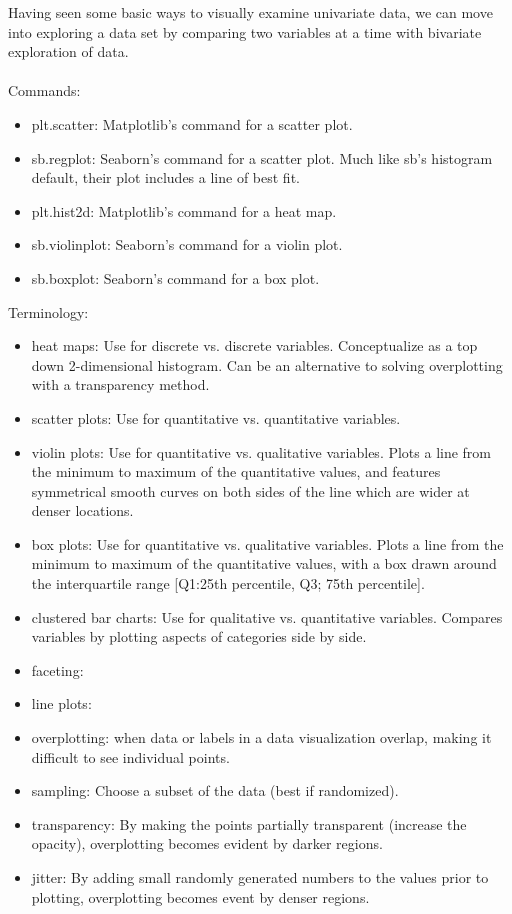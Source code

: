 Having seen some basic ways to visually examine univariate data, we can move into exploring a data set by comparing two variables at a time with bivariate exploration of data.
\\\\
Commands:
\begin{itemize}
	\item plt.scatter: Matplotlib's command for a scatter plot.
	\item sb.regplot: Seaborn's command for a scatter plot. Much like sb's histogram default, their plot includes a line of best fit.
	\item plt.hist2d: Matplotlib's command for a heat map.
	\item sb.violinplot: Seaborn's command for a violin plot.
	\item sb.boxplot: Seaborn's command for a box plot.
\end{itemize}

Terminology:
\begin{itemize}
	\item heat maps: Use for discrete vs. discrete variables. Conceptualize as a top down 2-dimensional histogram. Can be an alternative to solving overplotting with a transparency method.
	\item scatter plots: Use for quantitative vs. quantitative variables.
	\item violin plots: Use for quantitative vs. qualitative variables. Plots a line from the minimum to maximum of the quantitative values, and features symmetrical smooth curves on both sides of the line which are wider at denser locations.
	\item box plots: Use for quantitative vs. qualitative variables. Plots a line from the minimum to maximum of the quantitative values, with a box drawn around the interquartile range [Q1:25th percentile, Q3; 75th percentile].
	\item clustered bar charts: Use for qualitative vs. quantitative variables. Compares variables by plotting aspects of categories side by side.
	\item faceting:
	\item line plots:
	\item overplotting: when data or labels in a data visualization overlap, making it difficult to see individual points.
	\item sampling: Choose a subset of the data (best if randomized).
	\item transparency: By making the points partially transparent (increase the opacity), overplotting becomes evident by darker regions.
	\item jitter: By adding small randomly generated numbers to the values prior to plotting, overplotting becomes event by denser regions.
\end{itemize}

